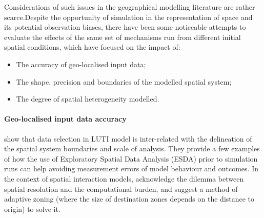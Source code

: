 \documentclass[3p,times,procedia]{elsarticle}
\begin{document}
Considerations of such issues in the geographical modelling literature are rather scarce.Despite the opportunity of simulation in the representation of space and its potential observation biases, there have been some noticeable attempts to evaluate the effects of the same set of mechanisms run from different initial spatial conditions, which have focused on the impact of:
\begin{itemize}
\item The accuracy of geo-localised input data;
\item The shape, precision and boundaries of the modelled spatial system;
\item The degree of spatial heterogeneity modelled.
\end{itemize}

\paragraph{Geo-localised input data accuracy} \citet{Thomasetal2017} show that data selection in LUTI model is inter-related with the delineation of the spatial system boundaries and scale of analysis. They provide a few examples of how the use of Exploratory Spatial Data Analysis (ESDA) prior to simulation runs can help avoiding measurement errors of model behaviour and outcomes. In the context of spatial interaction models, \citet{hagen2012new} acknowledge the dilemma between spatial resolution and the computational burden, and suggest a method of adaptive zoning (where the size of destination zones depends on the distance to origin) to solve it.
\end{document}
